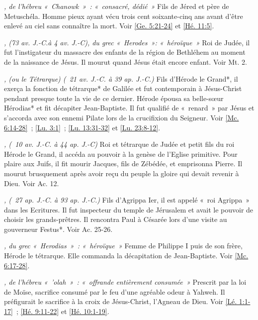 \begin{multicols}{2}
\textit{, de l'hébreu «~Chanowk~»~: «~consacré, dédié~»}\newline
Fils de Jéred et père de Metuschéla. Homme pieux ayant vécu trois cent soixante-cinq ans avant d'être enlevé au ciel sans connaître la mort. Voir \vref{Ge. 5:21-24} et \vref{Hé. 11:5}.

\textit{, (73 av. J.-C.à 4 av. J.-C), du grec «~Herodes~»: «~héroïque~»}\newline
Roi de Judée, il fut l'instigateur du massacre des enfants de la région de Bethléhem au moment de la naissance de Jésus. Il mourut quand Jésus était encore enfant. Voir Mt. 2.

\textit{, (ou le Tétrarque) (\ 21 av. J.-C. à 39 ap. J.-C.)}\newline
Fils d'Hérode le Grand*, il exerça la fonction de tétrarque* de Galilée et fut contemporain à Jésus-Christ pendant presque toute la vie de ce dernier. Hérode épousa sa belle-sœur Hérodias* et fit décapiter Jean-Baptiste. Il fut qualifié de «~renard~» par Jésus et s'accorda avec son ennemi Pilate lors de la crucifixion du Seigneur. Voir \vref{Mc. 6:14-28}~; \vref{Lu. 3:1}~; \vref{Lu. 13:31-32} et \vref{Lu. 23:8-12}.

\textit{, (\ 10 av. J.-C. à 44 ap. J.-C)}\newline
Roi et tétrarque de Judée et petit fils du roi Hérode le Grand, il accéda au pouvoir à la genèse de l'Eglise primitive. Pour plaire aux Juifs, il fit mourir Jacques, fils de Zébédée, et emprisonna Pierre. Il mourut brusquement après avoir reçu du peuple la gloire qui devait revenir à Dieu. Voir Ac. 12.

\textit{, (\ 27 ap. J.-C. à 93 ap. J.-C.)}\newline
Fils d'Agrippa Ier, il est appelé «~roi Agrippa~» dans les Ecritures. Il fut inspecteur du temple de Jérusalem et avait le pouvoir de choisir les grands-prêtres. Il rencontra Paul à Césarée lors d'une visite au gouverneur Festus*. Voir Ac. 25-26.

\textit{, du grec «~Herodias~»~: «~héroïque~»}\newline
Femme de Philippe I puis de son frère, Hérode le tétrarque. Elle commanda la décapitation de Jean-Baptiste. Voir \vref{Mc. 6:17-28}.

\textit{, de l'hébreu «~'olah~»~: «~offrande entièrement consumée~»}\newline
Prescrit par la loi de Moïse, sacrifice consumé par le feu d'une agréable odeur à Yahweh. Il préfigurait le sacrifice à la croix de Jésus-Christ, l'Agneau de Dieu. Voir \vref{Lé. 1:1-17}~; \vref{Hé. 9:11-22} et \vref{Hé. 10:1-19}.


\end{multicols}
